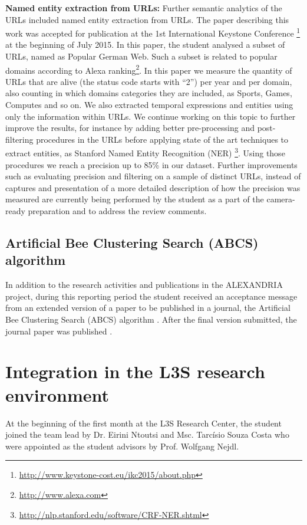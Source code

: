 \documentclass[a4paper,11pt]{report}
\begin{document}
\textbf{Named entity extraction from URLs:}
Further semantic analytics of the URLs included named entity extraction from URLs. 
The paper describing this work was accepted for publication at the 
1st International Keystone Conference
\footnote{\url{http://www.keystone-cost.eu/ikc2015/about.php}} at the beginning of
July 2015. 
In this paper, the student analysed a subset of URLs, named as Popular German
Web. Such a subset is related to popular domains according to Alexa
ranking\footnote{\url{http://www.alexa.com}}. In this paper we measure the
quantity of URLs that are alive (the status code starts with ``2'') per year and per domain, 
also counting in which domains categories they are included, as Sports, Games,
Computes and so on. We also extracted temporal expressions
and entities using only the information within URLs.
%
We continue working on this topic to further improve the results, for instance by adding better
pre-processing and post-filtering procedures in the URLs before applying state
of the art techniques to extract entities, as Stanford Named Entity Recognition
(NER) \footnote{\url{http://nlp.stanford.edu/software/CRF-NER.shtml}}. Using
those procedures we reach a precision up to 85\% in our dataset. 
%
Further improvements such as evaluating
precision and filtering on a sample of distinct URLs, instead of captures and
presentation of a more detailed description of how the precision was measured are currently 
being performed by the student as a part of the camera-ready preparation
and to address the review comments.

\subsection{Artificial Bee Clustering Search (ABCS) algorithm}
In addition to the research activities and publications in the ALEXANDRIA project, during this reporting period 
the student 
received an acceptance message from an extended version of a paper to be published in
a journal, the Artificial Bee Clustering Search (ABCS) algorithm \cite{costaiwann13}. 
After the final version submitted, the journal paper was published \cite{costa2014}. 

\section{Integration in the L3S research environment}
At the beginning of the first month at the L3S Research Center, the student 
joined the team lead by Dr. Eirini Ntoutsi and Msc. Tarcísio Souza Costa who
were appointed as the student advisors by Prof. Wolfgang Nejdl. 
\end{document}
